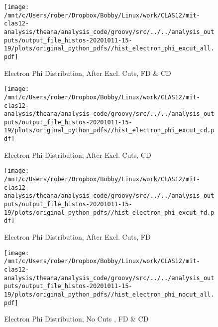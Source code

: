 \documentclass{article}
\begin{document}
\begin{landscape}

    \begin{figure}[h]
        \centering

        \texttt{[image: /mnt/c/Users/rober/Dropbox/Bobby/Linux/work/CLAS12/mit-clas12-analysis/theana/analysis\_code/groovy/src/../../analysis\_outputs/output\_file\_histos-20201011-15-19/plots/original\_python\_pdfs//hist\_electron\_phi\_excut\_all.pdf]}
        \captionsetup{textformat=empty,labelformat=blank}
        \caption{Electron Phi Distribution, After Excl. Cuts, FD \& CD}
    \end{figure}
    \clearpage
    
    \begin{figure}[h]
        \centering

        \texttt{[image: /mnt/c/Users/rober/Dropbox/Bobby/Linux/work/CLAS12/mit-clas12-analysis/theana/analysis\_code/groovy/src/../../analysis\_outputs/output\_file\_histos-20201011-15-19/plots/original\_python\_pdfs//hist\_electron\_phi\_excut\_cd.pdf]}
        \captionsetup{textformat=empty,labelformat=blank}
        \caption{Electron Phi Distribution, After Excl. Cuts, CD}
    \end{figure}
    \clearpage
    
    \begin{figure}[h]
        \centering

        \texttt{[image: /mnt/c/Users/rober/Dropbox/Bobby/Linux/work/CLAS12/mit-clas12-analysis/theana/analysis\_code/groovy/src/../../analysis\_outputs/output\_file\_histos-20201011-15-19/plots/original\_python\_pdfs//hist\_electron\_phi\_excut\_fd.pdf]}
        \captionsetup{textformat=empty,labelformat=blank}
        \caption{Electron Phi Distribution, After Excl. Cuts, FD}
    \end{figure}
    \clearpage
    
    \begin{figure}[h]
        \centering

        \texttt{[image: /mnt/c/Users/rober/Dropbox/Bobby/Linux/work/CLAS12/mit-clas12-analysis/theana/analysis\_code/groovy/src/../../analysis\_outputs/output\_file\_histos-20201011-15-19/plots/original\_python\_pdfs//hist\_electron\_phi\_nocut\_all.pdf]}
        \captionsetup{textformat=empty,labelformat=blank}
        \caption{Electron Phi Distribution, No Cuts , FD \& CD}
    \end{figure}
    \clearpage
    
    \begin{figure}[h]
        \centering


\end{figure}
\end{landscape}
\end{document}
